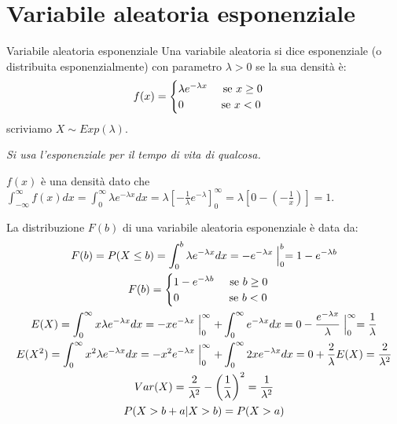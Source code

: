 \section{Variabile aleatoria esponenziale}
\begin{Definition}{Variabile aleatoria esponenziale}{}
    Una variabile aleatoria si dice esponenziale (o distribuita esponenzialmente) con parametro $\lambda>0$ se la sua densità è:
    \begin{equation*}
        f(x)=\begin{cases}
            \lambda e^{-\lambda x}\hspace{0.5cm}\mbox{se }x\geq0\\0\hspace{1.2cm}\mbox{se }x<0
        \end{cases}
    \end{equation*}
    scriviamo $X\sim Exp(\lambda)$.

    \textit{Si usa l'esponenziale per il tempo di vita di qualcosa.}
\end{Definition}

$f(x)$ è una densità dato che $\int^\infty_{-\infty}f(x)dx=\int^\infty_0\lambda e^{-\lambda x}dx=\lambda\left[-\frac{1}{\lambda}e^{-\lambda}\right]^\infty_0=\lambda\left[0-\left(-\frac{1}{x}\right)\right]=1$.

La distribuzione $F(b)$ di una variabile aleatoria esponenziale è data da:
\begin{gather*}
    F(b)=P(X\leq b)=\int^b_0\lambda e^{-\lambda x}dx=-e^{-\lambda x}\Bigm\lvert^b_0=1-e^{-\lambda b}\\
    F(b)=\begin{cases}
        1-e^{-\lambda b}\hspace{0.5cm}\mbox{se }b\geq0\\
        0\hspace{1.6cm}\mbox{se }b<0
    \end{cases}\\
    E(X)=\int^\infty_0x\lambda e^{-\lambda x}dx=-xe^{-\lambda x}\Bigm\lvert^\infty_0+\int^\infty_0e^{-\lambda x}dx=0-\frac{e^{-\lambda x}}{\lambda}\Bigm\lvert^\infty_0=\frac{1}{\lambda}\\
    E(X^2)=\int^\infty_0x^2\lambda e^{-\lambda x}dx=-x^2e^{-\lambda x}\Bigm\lvert^\infty_0+\int^\infty_02xe^{-\lambda x}dx=0+\frac{2}{\lambda}E(X)=\frac{2}{\lambda^2}\\
    Var(X)=\frac{2}{\lambda^2}-\left(\frac{1}{\lambda}\right)^2=\frac{1}{\lambda^2}\\
    P(X>b+a|X>b)=P(X>a)
\end{gather*}

